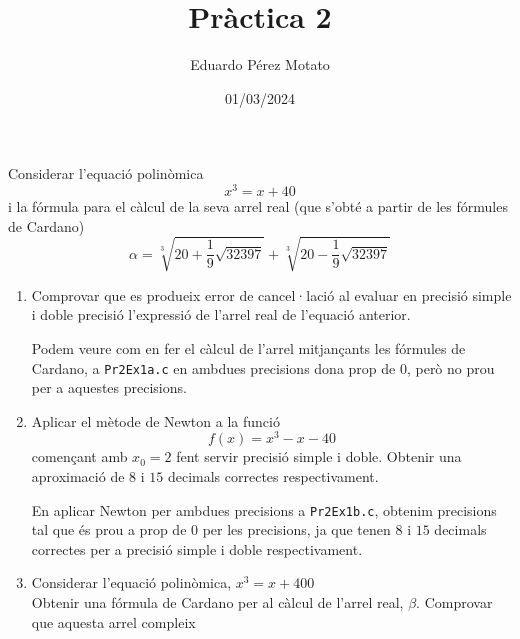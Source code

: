 \documentclass[a4paper, 12pt]{article}
\title{Pràctica 2}
\author{Eduardo Pérez Motato}
\date{01/03/2024}
\begin{document}
    \makeheader

    \begin{exercici}
        Considerar l'equació polinòmica
        \begin{equation}
            x^3 = x + 40
            \label{eq:1}
        \end{equation}
        i la fórmula para el càlcul de la seva arrel real (que s'obté a partir de les fórmules de
        Cardano)
        \begin{displaymath}
            \alpha = \sqrt[3]{20 + \frac{1}{9}\sqrt{32397}} + \sqrt[3]{20-\frac{1}{9}\sqrt{32397}}
        \end{displaymath}
        \begin{enumerate}[label=\alph*)]
            \item Comprovar que es produeix error de cancel·lació al evaluar en precisió simple i
            doble precisió l'expressió de l'arrel real de l'equació anterior.\\
            \begin{solucio}
                Podem veure com en fer el càlcul de l'arrel mitjançants les fórmules de Cardano, a
                \verb|Pr2Ex1a.c| en ambdues precisions dona prop de $0$, però no prou per a aquestes
                precisions. 
            \end{solucio}
            \item Aplicar el mètode de Newton a la funció
            \begin{displaymath}
                f\left(x\right) = x^3-x-40 
            \end{displaymath}
            començant amb $x_0 = 2$ fent servir precisió simple i doble. Obtenir una aproximació de
            $8$ i $15$ decimals correctes respectivament.\\
            \begin{solucio}
                En aplicar Newton per ambdues precisions a \verb|Pr2Ex1b.c|, obtenim precisions tal
                que és prou a prop de $0$ per les precisions, ja que tenen $8$ i $15$ decimals
                correctes per a precisió simple i doble respectivament.
            \end{solucio}
            \item Considerar l'equació polinòmica, $x^3=x+400$\\
            Obtenir una fórmula de Cardano per al càlcul de l'arrel real, $\beta$. Comprovar que
            aquesta arrel compleix
            \begin{displaymath}

\end{displaymath}
\end{enumerate}
\end{exercici}
\end{document}
